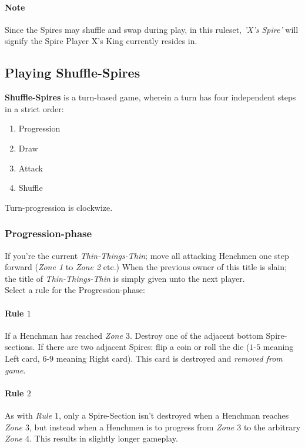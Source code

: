 \documentclass[11pt,twocolumn]{article}
\begin{document}
\paragraph{Note}
Since the Spires may shuffle and swap during play, in this ruleset, \textit{'X's Spire'} will signify the Spire Player X's King currently resides in.

\subsection{Playing Shuffle-Spires}
\label{sec:playingshufflespires}
\textbf{Shuffle-Spires} is a turn-based game, wherein a turn has four independent steps in a strict order:
\begin{enumerate}[noitemsep]
\item  Progression
\item Draw
\item Attack
\item Shuffle
\end{enumerate}
Turn-progression is clockwize.

\subsubsection{Progression-phase}
\label{sec:playingshufflespires_progressionphase}
If you’re the current \textit{Thin-Things-Thin}; move all attacking Henchmen one step forward (\textit{Zone 1} to \textit{Zone 2} etc.)
When the previous owner of this title is slain; the title of \textit{Thin-Things-Thin} is simply given unto the next player.\\

\noindent
Select a rule for the Progression-phase:

\paragraph{Rule $1$}
If a Henchman has reached \textit{Zone $3$}. Destroy one of the adjacent bottom Spire-sections.
If there are two adjacent Spires: flip a coin or roll the die ($1$-$5$ meaning Left card, $6$-$9$ meaning Right card).
This card is destroyed and \textit{removed from game}.

\paragraph{Rule $2$}
As with \textit{Rule $1$}, only a Spire-Section isn’t destroyed when a Henchman reaches \textit{Zone $3$}, but instead when a Henchmen is to progress from \textit{Zone $3$} to the arbitrary \textit{Zone $4$}.
This results in slightly longer gameplay.\\
\end{document}
